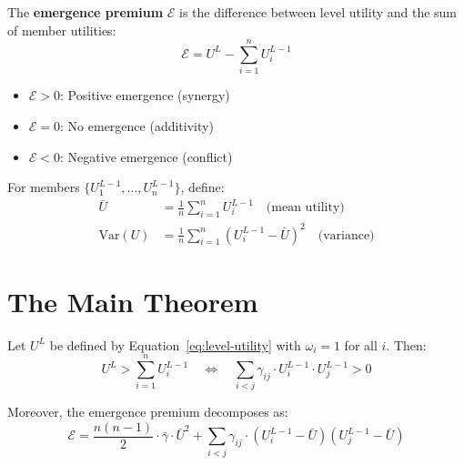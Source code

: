 \begin{definition}
\label{def:emergence}
The \textbf{emergence premium} $\mathcal{E}$ is the difference between
level utility and the sum of member utilities:
\begin{equation}
\mathcal{E} = U^L - \sum_{i=1}^{n} U^{L-1}_i
\label{eq:emergence-def}
\end{equation}
\begin{itemize}[nosep]
\item $\mathcal{E} > 0$: Positive emergence (synergy)
\item $\mathcal{E} = 0$: No emergence (additivity)
\item $\mathcal{E} < 0$: Negative emergence (conflict)
\end{itemize}
\end{definition}

\begin{definition}
\label{def:utility-stats}
For members $\{U^{L-1}_1, \ldots, U^{L-1}_n\}$, define:
\begin{align}
\bar{U} &= \frac{1}{n} \sum_{i=1}^{n} U^{L-1}_i \quad \text{(mean utility)} \\
\text{Var}(U) &= \frac{1}{n} \sum_{i=1}^{n} (U^{L-1}_i - \bar{U})^2 \quad \text{(variance)}
\end{align}
\end{definition}


\section{The Main Theorem}
\label{sec:let-theorem}

\begin{theorem}
\label{thm:let}
Let $U^L$ be defined by Equation~\ref{eq:level-utility} with $\omega_i = 1$ for all $i$.
Then:
\begin{equation}
U^L > \sum_{i=1}^{n} U^{L-1}_i \quad \Longleftrightarrow \quad \sum_{i<j} \gamma_{ij} \cdot U^{L-1}_i \cdot U^{L-1}_j > 0
\label{eq:let-condition}
\end{equation}

Moreover, the emergence premium decomposes as:
\begin{equation}
\boxed{\mathcal{E} = \frac{n(n-1)}{2} \cdot \bar{\gamma} \cdot \bar{U}^2 + \sum_{i<j} \gamma_{ij} \cdot (U^{L-1}_i - \bar{U})(U^{L-1}_j - \bar{U})}
\label{eq:emergence-decomposition}
\end{equation}
\end{theorem}

